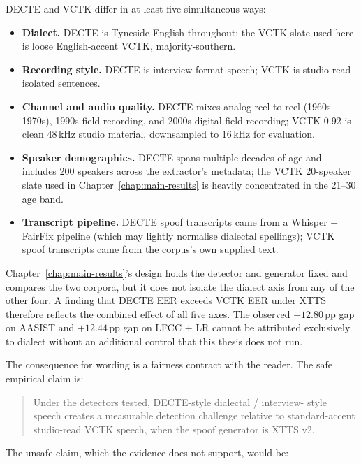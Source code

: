 DECTE and VCTK differ in at least five simultaneous ways:

\begin{itemize}
    \item \textbf{Dialect.} DECTE is Tyneside English throughout; the VCTK
        slate used here is loose English-accent VCTK, majority-southern.
    \item \textbf{Recording style.} DECTE is interview-format speech;
        VCTK is studio-read isolated sentences.
    \item \textbf{Channel and audio quality.} DECTE mixes analog reel-to-reel
        (1960s--1970s), 1990s field recording, and 2000s digital field
        recording; VCTK 0.92 is clean 48\,kHz studio material, downsampled
        to 16\,kHz for evaluation.
    \item \textbf{Speaker demographics.} DECTE spans multiple decades of age
        and includes 200 speakers across the extractor's metadata;
        the VCTK 20-speaker slate used in Chapter~\ref{chap:main-results} is heavily
        concentrated in the 21--30 age band.
    \item \textbf{Transcript pipeline.} DECTE spoof transcripts came from a
        Whisper + FairFix pipeline (which may lightly normalise
        dialectal spellings); VCTK spoof transcripts came from the
        corpus's own supplied text.
\end{itemize}

Chapter~\ref{chap:main-results}'s design holds the detector and generator fixed and
compares the two corpora, but it does not isolate the dialect
axis from any of the other four. A finding that DECTE EER exceeds
VCTK EER under XTTS therefore reflects the combined effect of
all five axes. The observed $+12.80$\,pp gap on AASIST and $+12.44$\,pp
gap on LFCC + LR cannot be attributed exclusively to dialect
without an additional control that this thesis does not run.

The consequence for wording is a fairness contract with the
reader. The safe empirical claim is:

\begin{quote}
Under the detectors tested, DECTE-style dialectal / interview-%
style speech creates a measurable detection challenge relative
to standard-accent studio-read VCTK speech, when the spoof
generator is XTTS v2.
\end{quote}

The unsafe claim, which the evidence does not support, would be:

